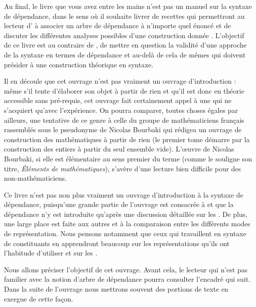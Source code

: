 Au final, le livre que vous avez entre les mains n’est pas un manuel sur la syntaxe de dépendance, dans le sens où il  souhaite  livrer de recettes qui permettront au lecteur d’ à associer un arbre de dépendance à n’importe quel énoncé et de discuter les différentes analyses possibles d’une construction donnée . L’objectif de ce livre est au contraire de  , de mettre en question la validité d’une approche de la syntaxe en termes de dépendance et au-delà de cela de  mêmes qui doivent présider à une construction théorique en syntaxe.

Il en découle que cet ouvrage n’est pas vraiment un ouvrage d’introduction : même s’il tente d’élaborer son objet à partir de rien et qu’il est donc en théorie accessible sans pré-requis, cet ouvrage fait certainement appel à une  qui ne s’acquiert qu’avec l’expérience. On pourra comparer, toutes choses égales par ailleurs, une tentative de ce genre à celle du groupe de mathématiciens français rassemblés sous le pseudonyme de Nicolas Bourbaki qui rédigea un ouvrage de construction des mathématiques à partir de rien (le premier tome démarre par la construction des entiers à partir du seul ensemble vide). L’œuvre de Nicolas Bourbaki, si elle est élémentaire au sens premier du terme (comme le souligne son titre, \textit{Éléments} \textit{de mathématiques}), s’avère d’une lecture bien difficile pour des non-mathématiciens.

Ce livre n’est pas non plus vraiment un ouvrage d’introduction à la syntaxe de dépendance, puisqu’une grande partie de l’ouvrage est consacrée à    et que la dépendance n’y est introduite qu’après une discussion détaillée sur les . De plus, une large place est faite aux autres   et à la comparaison entre les différents modes de représentation. Nous pensons notamment que ceux qui travaillent en syntaxe de constituants en apprendront beaucoup sur les représentations qu’ils ont l’habitude d’utiliser et sur les .

Nous allons préciser l’objectif de cet ouvrage. Avant cela, le lecteur qui n’est pas familier avec la notion d’arbre de dépendance pourra consulter l’encadré qui suit. Dans la suite de l’ouvrage nous mettrons souvent des portions de texte en exergue de cette façon.

